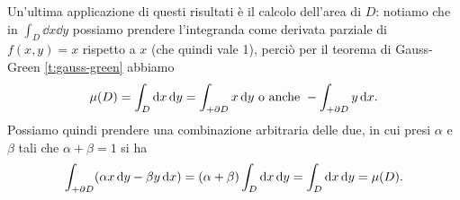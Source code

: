 Un'ultima applicazione di questi risultati è il calcolo dell'area di $D$: notiamo che in $\int_D\dd x\dd y$ possiamo prendere l'integranda come derivata parziale di $f(x,y)=x$ rispetto a $x$ (che quindi vale 1), perciò per il teorema di Gauss-Green \ref{t:gauss-green} abbiamo
\begin{equation}
	\mu(D)=\int_D\textup{d} x\,\textup{d} y=\int_{+\partial D}x\,\textup{d} y\text{ o anche }-\int_{+\partial D}y\,\textup{d} x.
\end{equation}
Possiamo quindi prendere una combinazione arbitraria delle due, in cui presi $\alpha$ e $\beta$ tali che $\alpha+\beta=1$ si ha
\begin{equation}
	\int_{+\partial D}(\alpha x\,\textup{d} y-\beta y\,\textup{d} x)=(\alpha+\beta)\int_D\textup{d} x\,\textup{d} y=\int_D\textup{d} x\,\textup{d} y=\mu(D).
\end{equation}

